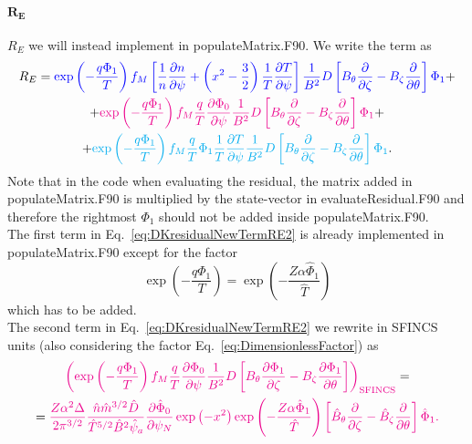 \documentclass[12pt]{article}
\newcommand{\p}{\partial}
\begin{document}
\paragraph*{$\bm{R_E}$}
$R_E$ we will instead implement in populateMatrix.F90. We write the term as 
\begin{multline}
R_E = \textcolor{blue}{
\exp \left(- \frac{q \Phi_1}{T}  \right) f_{M} \left[\frac{1}{n} \frac{\p n}{\p \psi}  + \left(x^2 - \frac{3}{2} \right) \frac{1}{T} \frac{\p T}{\p \psi}\right] \frac{1}{B^2} D \left[B_\theta \frac{\p }{\p \zeta} - B_\zeta \frac{\p }{\p \theta}\right] \Phi_1} + \\ +
\textcolor{magenta}{
\exp \left(- \frac{q \Phi_1}{T}  \right) f_{M} \frac{q}{T} \frac{\p \Phi_0}{\p \psi} \frac{1}{B^2} D \left[B_\theta \frac{\p }{\p \zeta} - B_\zeta \frac{\p }{\p \theta}\right]\Phi_1 } + \\ +
 \textcolor{cyan}{
 \exp \left(- \frac{q \Phi_1}{T}  \right) f_{M} \frac{q}{T} \Phi_1 \frac{1}{T} \frac{\p T}{\p \psi} \frac{1}{B^2} D \left[B_\theta \frac{\p }{\p \zeta} - B_\zeta \frac{\p }{\p \theta}\right] \Phi_1}.
\label{eq:DKresidualNewTermRE2}
\end{multline}
Note that in the code when evaluating the residual, the matrix added in populateMatrix.F90 is multiplied by the state-vector in evaluateResidual.F90 and therefore the rightmost $\Phi_1$ should not be added inside populateMatrix.F90.\\
The first term in Eq.~\ref{eq:DKresidualNewTermRE2} is already implemented in populateMatrix.F90 except for the factor 
\[
\exp \left(- \frac{q \Phi_1}{T}  \right) = \exp \left(- \frac{Z \alpha \hat{\Phi}_1}{\hat{T}}  \right)
\]
which has to be added.\\
The second term in Eq.~\ref{eq:DKresidualNewTermRE2} we rewrite in SFINCS units (also considering the factor Eq.~\ref{eq:DimensionlessFactor}) as
\begin{multline}
\textcolor{magenta}{
\left(\exp \left(- \frac{q \Phi_1}{T}  \right) f_{M} \frac{q}{T} \frac{\p \Phi_0}{\p \psi} \frac{1}{B^2} D \left[B_\theta \frac{\p \Phi_1}{\p \zeta} - B_\zeta \frac{\p \Phi_1}{\p \theta}\right] \right)_{\mathrm{SFINCS}} } = \\ = \textcolor{magenta}{
\frac{Z \alpha^2 \Delta}{2 \pi^{3/2}} \frac{\hat{n} \hat{m}^{3/2} \hat{D}}{\hat{T}^{5/2} \hat{B}^2 \hat{\psi}_a} \frac{\p \hat{\Phi}_0}{\p \psi_N} 
\exp\left(-x^2\right) \exp \left(- \frac{Z \alpha \hat{\Phi}_1}{\hat{T}}\right) \left[\hat{B}_{\theta} \frac{\p}{\p \zeta} - \hat{B}_{\zeta} \frac{\p}{\p \theta}\right] \hat{\Phi}_1.
}
\label{eq:REterm2}
\end{multline}
\end{document}
